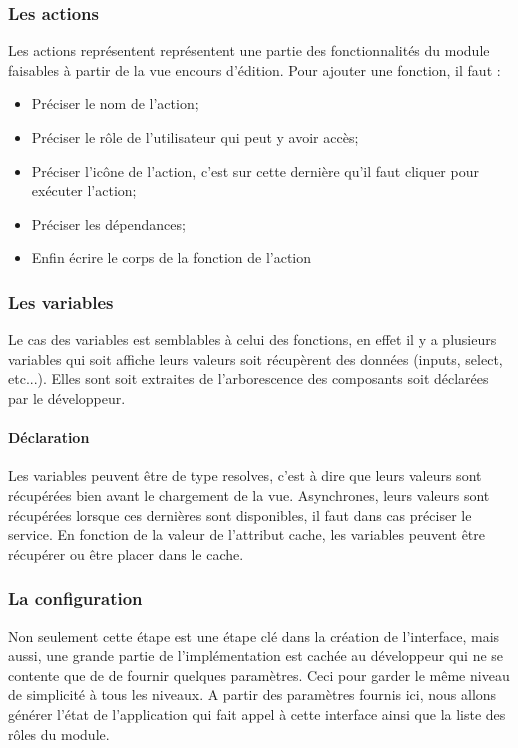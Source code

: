 \documentclass[a4paper,12pt]{article}
\begin{document}
\subsubsection{ Les actions}
Les actions représentent représentent une partie des fonctionnalités
du module faisables à partir de la vue encours d'édition.  Pour
ajouter une fonction, il faut :
\begin{itemize}
\item Préciser le nom de l'action;
\item  Préciser le rôle de l'utilisateur qui peut y avoir accès;
\item Préciser l'icône  de l'action, c'est sur cette dernière qu'il faut cliquer pour exécuter l'action;
\item Préciser les dépendances;
\item Enfin écrire le corps de la fonction de l'action
\end{itemize}
\subsubsection{ Les variables}
Le cas des variables est semblables à celui des fonctions, en effet il y a plusieurs variables
qui soit affiche leurs valeurs soit récupèrent des données (inputs, select, etc...). Elles sont soit extraites 
de l'arborescence des composants soit déclarées par le développeur.
\paragraph{Déclaration}
Les variables  peuvent être de type  resolves, c'est à dire que
leurs valeurs sont récupérées bien avant le chargement de la
vue. Asynchrones, leurs valeurs sont récupérées lorsque ces dernières
sont disponibles, il faut dans cas préciser le service.%
En fonction de la valeur de l'attribut cache, les variables peuvent être récupérer  ou être  placer dans le cache. 

\subsubsection{ La configuration} 
Non seulement cette étape est une étape clé dans la création de l'interface,
mais aussi, une grande partie de l'implémentation
est cachée au développeur qui ne se contente que de de fournir quelques paramètres. 
Ceci pour garder le même niveau de simplicité à tous les niveaux. A partir des paramètres fournis
ici, nous allons générer l'état de l'application qui fait appel à cette interface ainsi que la liste des rôles du module.
\end{document}
